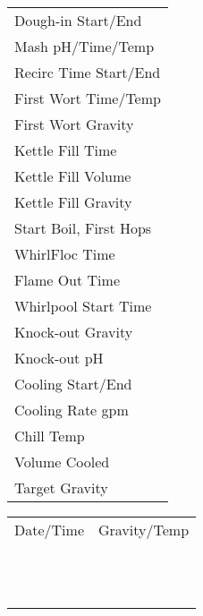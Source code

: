 \documentclass[12pt]{article}
\newcommand{\formline}[1][4cm]{\uline{\hspace{#1}}}
\begin{document}
\begin{multicols}{2}
\noindent
\begin{tabular}{l}
Dough-in Start/End \formline[5cm] \\
Mash pH/Time/Temp \formline[5cm] \\
Recirc Time Start/End \formline[5cm] \\
First Wort Time/Temp \formline[5cm] \\
First Wort Gravity \formline[5cm] \\
Kettle Fill Time \formline[5cm] \\
Kettle Fill Volume \formline[5cm] \\
Kettle Fill Gravity \formline[5cm] \\
Start Boil, First Hops \formline[5cm] \\
WhirlFloc Time \formline[5cm] \\
Flame Out Time \formline[5cm] \\
Whirlpool Start Time \formline[5cm] \\
Knock-out Gravity \formline[5cm] \\
Knock-out pH \formline[5cm] \\
Cooling Start/End \formline[5cm] \\
Cooling Rate gpm \formline[5cm] \\
Chill Temp \formline[5cm] \\
Volume Cooled \formline[5cm] \\
Target Gravity \formline[5cm]
\end{tabular}

\columnbreak

\noindent{}

\vspace{0.2cm}

\noindent
\begin{tabular}{p{3.5cm}p{3.5cm}}
Date/Time & Gravity/Temp \\[0.2cm]
\formline[3cm] & \formline[3cm] \\[0.3cm]
\formline[3cm] & \formline[3cm] \\[0.3cm]
\formline[3cm] & \formline[3cm] \\[0.3cm]
\formline[3cm] & \formline[3cm] \\[0.3cm]
\formline[3cm] & \formline[3cm] \\[0.3cm]
\formline[3cm] & \formline[3cm] \\[0.3cm]
\formline[3cm] & \formline[3cm] \\[0.3cm]
\formline[3cm] & \formline[3cm] \\[0.3cm]
\formline[3cm] & \formline[3cm] \\[0.3cm]
\formline[3cm] & \formline[3cm] \\[0.3cm]
\formline[3cm] & \formline[3cm] \\[0.3cm]
\formline[3cm] & \formline[3cm]
\end{tabular}

\end{multicols}
\end{document}
